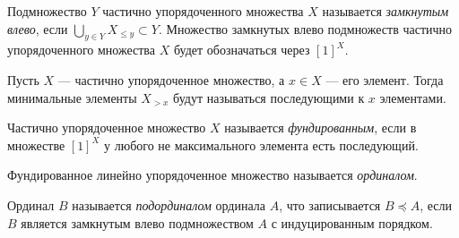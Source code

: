 \documentclass[
	extrafontsizes,
	11pt,
	hyphens,
]{memoir}
\begin{document}
\begin{definition}
Подмножество \(Y\) частично упорядоченного множества \(X\) называется \emph{замкнутым влево}, если \(\bigcup_{y \in Y} X_{\leq y} \subset Y\).
Множество замкнутых влево подмножеств частично упорядоченного множества \(X\) будет обозначаться через \([1]^X\).
\end{definition}



\begin{definition}
Пусть \(X\) --- частично упорядоченное множество, а \(x \in X\) --- его элемент. Тогда минимальные элементы \(X_{> x}\) будут называться последующими к \(x\) элементами.
\end{definition}

\begin{definition}
Частично упорядоченное множество \(X\) называется \emph{фундированным}, если в множестве \([1]^X\) у любого не максимального элемента есть последующий.
\end{definition}

\begin{definition}
Фундированное линейно упорядоченное множество называется \emph{ординалом}.
\end{definition}

\begin{definition}
Ординал \(B\) называется \emph{подординалом} ординала \(A\), что записывается \(B \preccurlyeq A\), если \(B\) является замкнутым влево подмножеством \(A\) с индуцированным порядком.
\end{definition}

\end{document}
